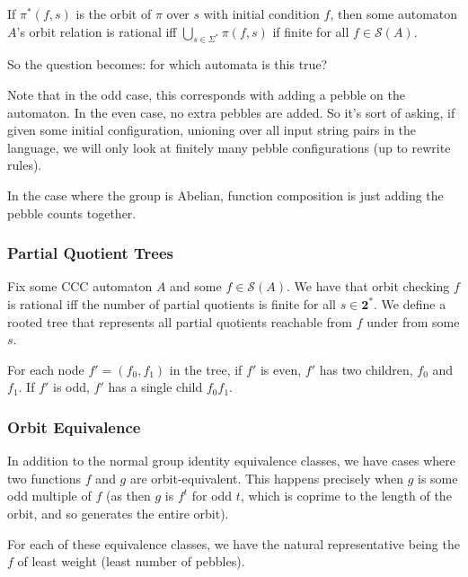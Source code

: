 \documentclass[11pt]{article}
\theoremstyle{pleasant}
\newtheorem{definition}{Definition}
\newcommand{\0}{\underline{0}}
\newcommand{\1}{\underline{1}}
\newcommand{\2}{\underline{2}}
\renewcommand{\S}{\mathcal{S}}
\begin{document}
If $\pi^*(f, s)$ is the orbit of $\pi$ over $s$ with initial condition $f$, then some automaton $A$'s orbit relation is rational iff $\bigcup_{s\in \Sigma^*} \pi(f, s)$ if finite for all $f \in \S(A)$.

So the question becomes: for which automata is this true?

Note that in the odd case, this corresponds with adding a pebble on the automaton. In the even case, no extra pebbles are added. So it's sort of asking, if given some initial configuration, unioning over all input string pairs in the language, we will only look at finitely many pebble configurations (up to rewrite rules).

In the case where the group is Abelian, function composition is just adding the pebble counts together.

\subsubsection*{Partial Quotient Trees}

Fix some CCC automaton $A$ and some $f \in \S(A)$. We have that orbit checking $f$ is rational iff the number of partial quotients is finite for all $s \in \textbf{2}^*$. We define a rooted tree that represents all partial quotients reachable from $f$ under from some $s$.

For each node $f' = (f_0, f_1)$ in the tree, if $f'$ is even, $f'$ has two children, $f_0$ and $f_1$. If $f'$ is odd, $f'$ has a single child $f_0 f_1$.

\subsubsection*{Orbit Equivalence}

In addition to the normal group identity equivalence classes, we have cases where two functions $f$ and $g$ are orbit-equivalent. This happens precisely when $g$ is some odd multiple of $f$ (as then $g$ is $f^t$ for odd $t$, which is coprime to the length of the orbit, and so generates the entire orbit).

For each of these equivalence classes, we have the natural representative being the $f$ of least weight (least number of pebbles).

\end{document}
